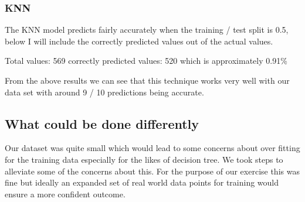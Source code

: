 \documentclass[conference]{IEEEtran}
\begin{document}
\subsubsection{KNN}
The KNN model predicts fairly accurately when the training / test split is 0.5, below I will include the correctly predicted values out of the actual values.

Total values:  569  correctly predicted values:  520 which is approximately 0.91\%

From the above results we can see that this technique works very well with our data set with around 9 / 10 predictions being accurate. 
\subsection{What could be done differently}
Our dataset was quite small which would lead to some concerns about over fitting for the training data especially for the likes of decision tree. We took steps to alleviate some of the concerns about this. For the purpose of our exercise this was fine but ideally an expanded set of real world data points for training would ensure a more confident outcome.
\newpage
\clearpage
\tableofcontents
\printbibliography
\listoffigures
\end{document}
